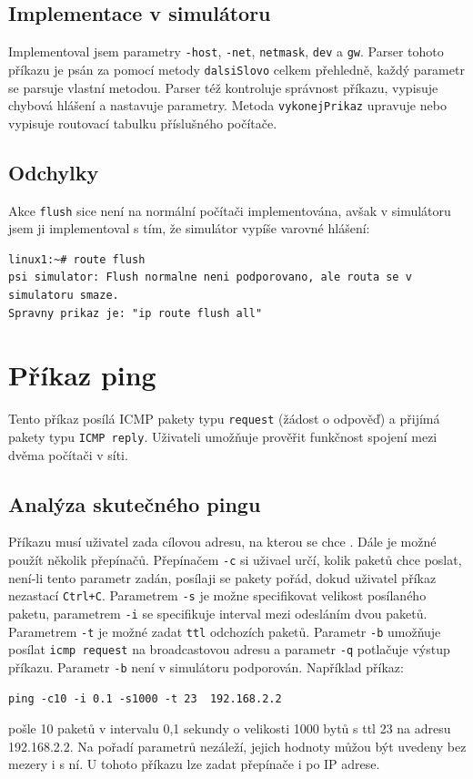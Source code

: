 \subsection{Implementace v simulátoru}

Implementoval jsem parametry \verb|-host|, \verb|-net|, \verb|netmask|, \verb|dev| a \verb|gw|. Parser tohoto příkazu je psán za pomocí metody \verb|dalsiSlovo| celkem přehledně, každý parametr se parsuje vlastní metodou. Parser též kontroluje správnost příkazu, vypisuje chybová hlášení a nastavuje parametry. Metoda \verb|vykonejPrikaz| upravuje nebo vypisuje routovací tabulku příslušného počítače.


\subsection{Odchylky}

Akce \verb|flush| sice není na normální počítači implementována, avšak v simulátoru jsem ji implementoval s tím, že simulátor vypíše varovné hlášení:
\begin{verbatim}
linux1:~# route flush
psi simulator: Flush normalne neni podporovano, ale routa se v simulatoru smaze.
Spravny prikaz je: "ip route flush all"
\end{verbatim}




\section{Příkaz ping}

Tento příkaz posílá ICMP pakety typu \verb|request| (žádost o odpověď) a přijímá pakety typu \verb|ICMP reply|. Uživateli umožňuje prověřit funkčnost spojení mezi dvěma počítači v síti.


\subsection{Analýza skutečného pingu}

Příkazu musí uživatel zada cílovou adresu, na kterou se chce . Dále je možné použít několik přepínačů. Přepínačem \verb|-c| si uživael určí, kolik paketů chce poslat, není-li tento parametr zadán, posílaji se pakety pořád, dokud uživatel příkaz nezastací \verb|Ctrl+C|. Parametrem \verb|-s| je možne specifikovat velikost posílaného paketu, parametrem \verb|-i| se specifikuje interval mezi odesláním dvou paketů. Parametrem \verb|-t| je možné zadat \verb|ttl| odchozích paketů. Parametr \verb|-b| umožňuje posílat \verb|icmp request| na broadcastovou adresu a parametr \verb|-q| potlačuje výstup příkazu. Parametr \verb|-b| není v simulátoru podporován. Například příkaz:
\begin{verbatim}
ping -c10 -i 0.1 -s1000 -t 23  192.168.2.2
\end{verbatim}
pošle 10 paketů v intervalu 0,1 sekundy o velikosti 1000 bytů s ttl 23 na adresu 192.168.2.2. Na pořadí parametrů nezáleží, jejich hodnoty můžou být uvedeny bez mezery i s ní. U tohoto příkazu lze zadat přepínače i po IP adrese.


